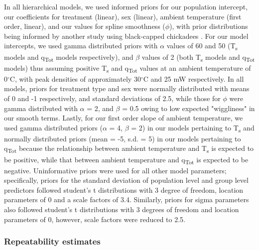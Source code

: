 \documentclass[12pt]{article}
\begin{document}
\noindent In all hierarchical models, we used informed priors for our population intercept, our coefficients for treatment (linear), sex (linear), ambient temperature (first order, linear), and our values for spline smoothness ($\phi$), with prior distributions being informed by another study using black-capped chickadees \citep{robertson_2020a}. For our model intercepts, we used gamma distributed priors with $\alpha$ values of 60 and 50 (T\textsubscript{s} models and q\textsubscript{Tot} models respectively), and $\beta$ values of 2 (both T\textsubscript{s} models and q\textsubscript{Tot} models) thus assuming positive T\textsubscript{s} and q\textsubscript{Tot} values at an ambient temperature of 0$^{\circ}$C, with peak densities of approximately 30$^{\circ}$C and 25 mW respectively. In all models, priors for treatment type and sex were normally distributed with means of 0 and -1 respectively, and standard deviations of 2.5, while those for $\phi$ were gamma distributed with $\alpha$ = 2, and $\beta$ = 0.5 owing to low expected "wiggliness" in our smooth terms. Lastly, for our first order slope of ambient temperature, we used gamma distributed priors ($\alpha$ = 4, $\beta$ = 2) in our models pertaining to T\textsubscript{s} and normally distributed priors (mean = -5, s.d. = 5) in our models pertaining to q\textsubscript{Tot} because the relationship between ambient temperature and T\textsubscript{s} is expected to be positive, while that between ambient temperature and q\textsubscript{Tot} is expected to be negative. Uninformative priors were used for all other model parameters; specifically, priors for the standard deviation of population level and group level predictors followed student's t distributions with 3 degree of freedom, location parameters of 0 and a scale factors of 3.4. Similarly, priors for sigma parameters also followed student's t distributions with 3 degrees of freedom and location parameters of 0, however, scale factors were reduced to 2.5.\vspace{0.5cm}

\subsubsection{Repeatability estimates}
\vspace{0.5cm}
\end{document}
